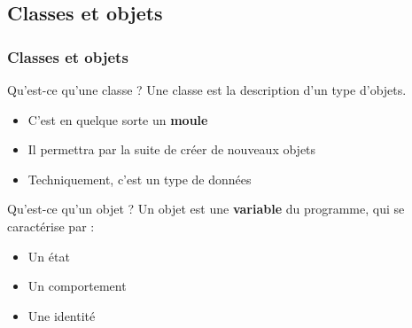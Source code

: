 \documentclass{beamer}
\begin{document}
\subsection{Classes et objets}

\begin{frame}
\frametitle{Classes et objets}
\begin{block}{Qu'est-ce qu'une classe ?}
Une classe est la description d'un type d'objets.
\begin{itemize}
\item{C'est en quelque sorte un \textbf{moule}}
\item{Il permettra par la suite de créer de nouveaux objets}
\item{Techniquement, c'est un type de données}
\end{itemize}
\end{block}
\begin{block}{Qu'est-ce qu'un objet ?}
Un objet est une \textbf{variable} du programme, qui se caractérise par :
\begin{itemize}
\item{Un état}
\item{Un comportement}
\item{Une identité}
\end{itemize}
\end{block}
\end{frame}
\end{document}
